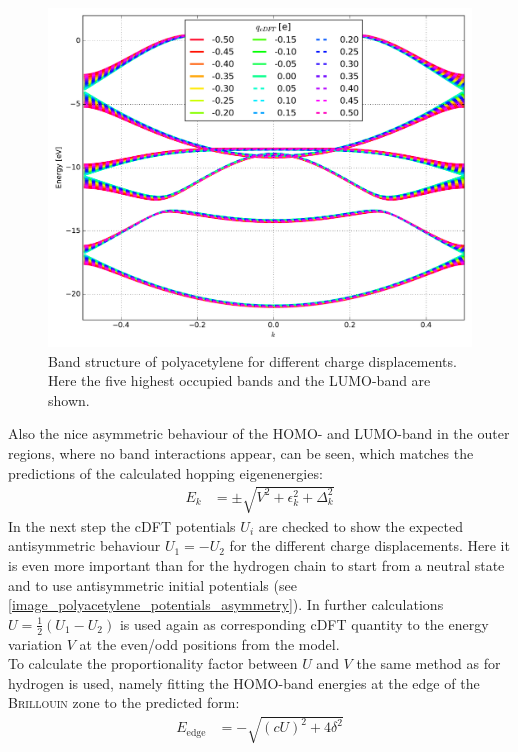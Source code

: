 \begin{figure}
	\centering
	\includegraphics[width = 13cm]{Images/polyacetylene/charging/band_structure_q_1}
	\caption{Band structure of polyacetylene for different charge displacements. Here the five highest occupied bands and the LUMO-band are shown.}
	\label{image_polyacetylene_band_structure_charging}
\end{figure}
Also the nice asymmetric behaviour of the HOMO- and LUMO-band in the outer regions, where no band interactions appear, can be seen, which matches the predictions of the calculated hopping eigenenergies:
\begin{align}
	E_k &= \pm \sqrt{V^2+\epsilon_k^2+\Delta_k^2}
\end{align}
In the next step the cDFT potentials $U_i$ are checked to show the expected antisymmetric behaviour $U_1 = -U_2$ for the different charge displacements. Here it is even more important than for the hydrogen chain to start from a neutral state and to use antisymmetric initial potentials (see \cref{image_polyacetylene_potentials_asymmetry}). In further calculations $U = \frac{1}{2}(U_1 - U_2)$ is used again as corresponding cDFT quantity to the energy variation $V$ at the even/odd positions from the model.\\
To calculate the proportionality factor between $U$ and $V$ the same method as for hydrogen is used, namely fitting the HOMO-band energies at the edge of the \textsc{Brillouin} zone to the predicted form:
\begin{align}
	E_\text{edge} &= -\sqrt{\left(cU\right)^2 + 4 \delta^2}
\end{align}
